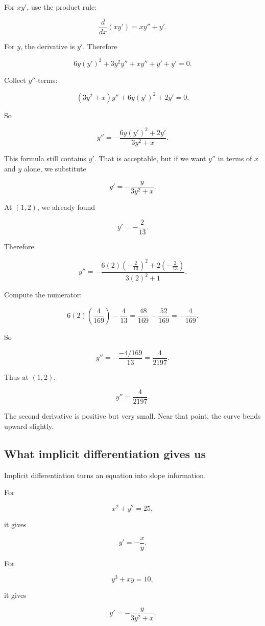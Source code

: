 For \(xy'\), use the product rule:

\[
\frac{d}{dx}(xy')=xy''+y'.
\]

For \(y\), the derivative is \(y'\).  Therefore

\[
6y(y')^2+3y^2y''+xy''+y'+y'=0.
\]

Collect \(y''\)-terms:

\[
(3y^2+x)y''+6y(y')^2+2y'=0.
\]

So

\[
\boxed{
y''
=
-\frac{6y(y')^2+2y'}{3y^2+x}.
}
\]

This formula still contains \(y'\).  That is acceptable, but if we want \(y''\) in terms of \(x\) and \(y\) alone, we substitute

\[
y'=-\frac{y}{3y^2+x}.
\]

At \((1,2)\), we already found

\[
y'=-\frac{2}{13}.
\]

Therefore

\[
y''
=
-\frac{6(2)\left(-\frac{2}{13}\right)^2+2\left(-\frac{2}{13}\right)}{3(2)^2+1}.
\]

Compute the numerator:

\[
6(2)\left(\frac{4}{169}\right)-\frac{4}{13}
=
\frac{48}{169}-\frac{52}{169}
=
-\frac{4}{169}.
\]

So

\[
y''
=
-\frac{-4/169}{13}
=
\frac{4}{2197}.
\]

Thus at \((1,2)\),

\[
\boxed{
y''=\frac{4}{2197}.
}
\]

The second derivative is positive but very small.  Near that point, the curve bends upward slightly.

\subsection{What implicit differentiation gives us}
\label{subsec:what-implicit-differentiation-gives}

Implicit differentiation turns an equation into slope information.

For

\[
x^2+y^2=25,
\]

it gives

\[
y'=-\frac{x}{y}.
\]

For

\[
y^3+xy=10,
\]

it gives

\[
y'=-\frac{y}{3y^2+x}.
\]

